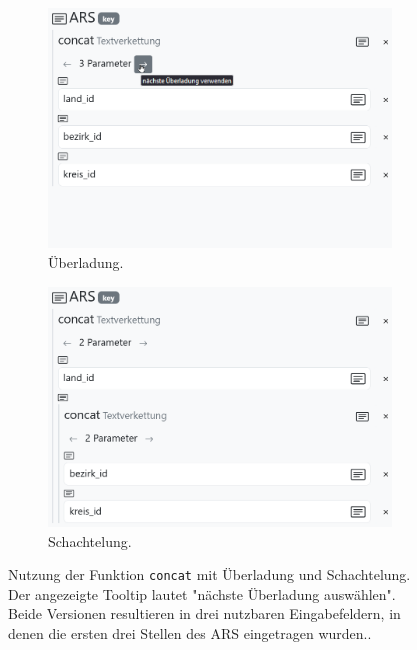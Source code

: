 \begin{figure}[!ht]
  \centering
  \begin{subfigure}{.4625\textwidth}
    \includegraphics[width=\linewidth]{assets/concat-overload.png}
    \caption{Überladung.}
    \label{fig:concat-overload}
  \end{subfigure}
  \hspace{.025\textwidth}
  \begin{subfigure}{.4625\textwidth}
    \includegraphics[width=\linewidth]{assets/concat-nested.png}
    \caption{Schachtelung.}
    \label{fig:concat-nested}
  \end{subfigure}
  \caption[Nutzung der Funktion \texttt{concat} mit Überladung und Schachtelung]{Nutzung der Funktion \texttt{concat} mit Überladung und Schachtelung. Der angezeigte Tooltip lautet "nächste Überladung auswählen". Beide Versionen resultieren in drei nutzbaren Eingabefeldern, in denen die ersten drei Stellen des \acs{ARS} eingetragen wurden..}
  \label{fig:concat}
\end{figure}

